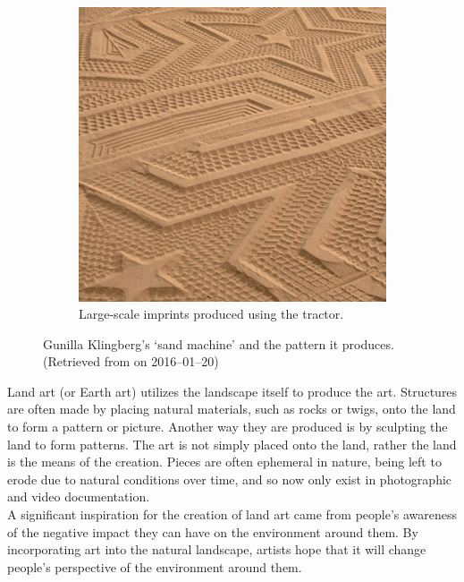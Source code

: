 \begin{figure}
\begin{subfigure}[b]{0.45\textwidth}
            \includegraphics[width=\textwidth]{Files/sand_machine_art.jpg}
            \caption{Large-scale imprints produced using the tractor.}
            \label{fig: sand machine art}
        \end{subfigure}
        \caption{Gunilla Klingberg's `sand machine' and the pattern it produces. \small (Retrieved from      on 2016--01--20)}
        \label{fig: sand machine and art}
    \end{figure}
    Land art (or Earth art) utilizes the landscape itself to produce the art. Structures are often made by placing natural materials, such as rocks or twigs, onto the land to form a pattern or picture. Another way they are produced is by sculpting the land to form patterns. The art is not simply placed onto the land, rather the land is the means of the creation. Pieces are often ephemeral in nature, being left to erode due to natural conditions over time, and so now only exist in photographic and video documentation.\\
    A significant inspiration for the creation of land art came from people's awareness of the negative impact they can have on the environment around them. By incorporating art into the natural landscape, artists hope that it will change people’s perspective of the environment around them.

